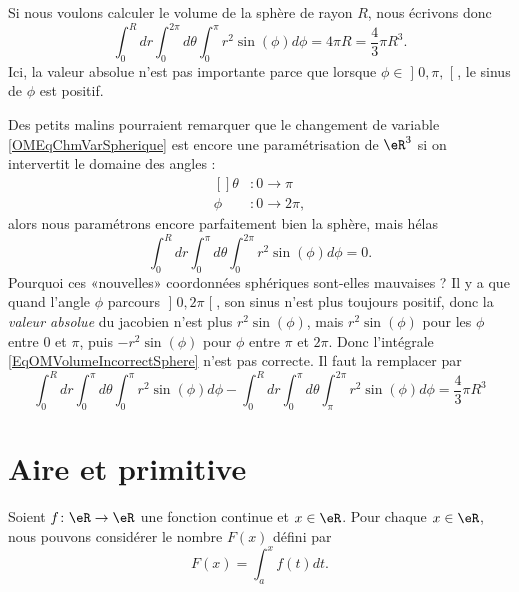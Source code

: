 Si nous voulons calculer le volume de la sphère de rayon $R$, nous écrivons donc
\begin{equation}
	\int_0^Rdr\int_{0}^{2\pi}d\theta\int_0^{\pi}r^2 \sin(\phi)d\phi=4\pi R=\frac{ 4 }{ 3 }\pi R^3.
\end{equation}
Ici, la valeur absolue n'est pas importante parce que lorsque $\phi\in\mathopen] 0,\pi ,  \mathclose[$, le sinus de $\phi$ est positif.

Des petits malins pourraient remarquer que le changement de variable \eqref{OMEqChmVarSpherique} est encore une paramétrisation de $\eR^3$ si on intervertit le domaine des angles : 
\begin{equation}
	\begin{aligned}[]
		\theta&\colon 0 \to \pi\\
		\phi	&\colon 0\to 2\pi,
	\end{aligned}
\end{equation}
alors nous paramétrons encore parfaitement bien la sphère, mais hélas
\begin{equation}		\label{EqOMVolumeIncorrectSphere}
	\int_0^Rdr\int_{0}^{\pi}d\theta\int_0^{2\pi}r^2 \sin(\phi)d\phi=0.
\end{equation}
Pourquoi ces «nouvelles» coordonnées sphériques sont-elles mauvaises ? Il y a que quand l'angle $\phi$ parcours $\mathopen] 0 , 2\pi \mathclose[$, son sinus n'est plus toujours positif, donc la \emph{valeur absolue} du jacobien n'est plus $r^2\sin(\phi)$, mais $r^2\sin(\phi)$ pour les $\phi$ entre $0$ et $\pi$, puis $-r^2\sin(\phi)$ pour $\phi$ entre $\pi$ et $2\pi$. Donc l'intégrale \eqref{EqOMVolumeIncorrectSphere} n'est pas correcte. Il faut la remplacer par
\begin{equation}
	\int_0^Rdr\int_{0}^{\pi}d\theta\int_0^{\pi}r^2 \sin(\phi)d\phi- \int_0^Rdr\int_{0}^{\pi}d\theta\int_{\pi}^{2\pi}r^2 \sin(\phi)d\phi = \frac{ 4 }{ 3 }\pi R^3
\end{equation}

\section{Aire et primitive}

Soient $f\colon \eR\to \eR$ une fonction continue et $x\in\eR$. Pour chaque $x\in\eR$, nous pouvons considérer le nombre $F(x)$ défini par
\begin{equation}
	F(x)=\int_a^x f(t)dt.
\end{equation}

